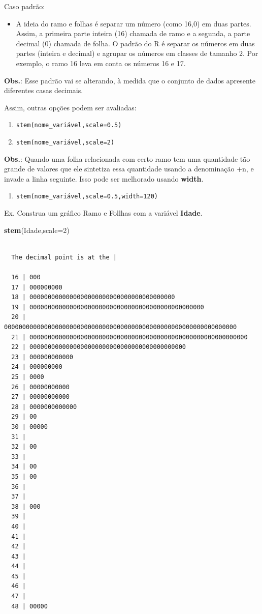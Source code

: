\documentclass[12pt,brazil,oneside]{book}
\newenvironment{Shaded}{\begin{snugshade}}{\end{snugshade}}
\newcommand{\DataTypeTok}[1]{\textcolor[rgb]{0.13,0.29,0.53}{#1}}
\newcommand{\DecValTok}[1]{\textcolor[rgb]{0.00,0.00,0.81}{#1}}
\newcommand{\KeywordTok}[1]{\textcolor[rgb]{0.13,0.29,0.53}{\textbf{#1}}}
\newcommand{\NormalTok}[1]{#1}
\providecommand{\tightlist}{%
  \setlength{\itemsep}{0pt}\setlength{\parskip}{0pt}}
\begin{document}
Caso padrão:

\begin{itemize}
\tightlist
\item
  A ideia do ramo e folhas é separar um número (como 16,0) em duas
  partes. Assim, a primeira parte inteira (16) chamada de ramo e a
  segunda, a parte decimal (0) chamada de folha. O padrão do R é separar
  os números em duas partes (inteira e decimal) e agrupar os números em
  classes de tamanho 2. Por exemplo, o ramo 16 leva em conta os números
  16 e 17.
\end{itemize}

\textbf{Obs.}: Esse padrão vai se alterando, à medida que o conjunto de
dados apresente diferentes casas decimais.

Assim, outras opções podem ser avaliadas:

\begin{enumerate}
\def\labelenumi{\alph{enumi})}
\item
  \texttt{stem(nome\_variável,scale=0.5)}
\item
  \texttt{stem(nome\_variável,scale=2)}
\end{enumerate}

\textbf{Obs.}: Quando uma folha relacionada com certo ramo tem uma
quantidade tão grande de valores que ele sintetiza essa quantidade
usando a denominação +n, e invade a linha seguinte. Isso pode ser
melhorado usando \textbf{width}.

\begin{enumerate}
\def\labelenumi{\alph{enumi})}
\setcounter{enumi}{2}
\tightlist
\item
  \texttt{stem(nome\_variável,scale=0.5,width=120)}
\end{enumerate}

Ex. Construa um gráfico Ramo e Follhas com a variável \textbf{Idade}.

\begin{Shaded}
\begin{Highlighting}[]
\KeywordTok{stem}\NormalTok{(Idade,}\DataTypeTok{scale=}\DecValTok{2}\NormalTok{)}
\end{Highlighting}
\end{Shaded}

\begin{verbatim}

  The decimal point is at the |

  16 | 000
  17 | 000000000
  18 | 0000000000000000000000000000000000000000
  19 | 000000000000000000000000000000000000000000000000
  20 | 0000000000000000000000000000000000000000000000000000000000000000
  21 | 000000000000000000000000000000000000000000000000000000000000
  22 | 0000000000000000000000000000000000000000000
  23 | 000000000000
  24 | 000000000
  25 | 0000
  26 | 00000000000
  27 | 00000000000
  28 | 0000000000000
  29 | 00
  30 | 00000
  31 | 
  32 | 00
  33 | 
  34 | 00
  35 | 00
  36 | 
  37 | 
  38 | 000
  39 | 
  40 | 
  41 | 
  42 | 
  43 | 
  44 | 
  45 | 
  46 | 
  47 | 
  48 | 00000
\end{verbatim}
\end{document}
